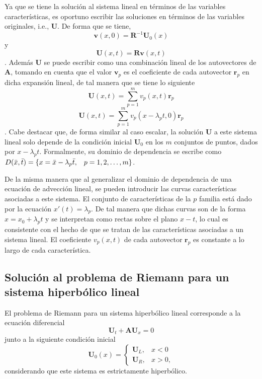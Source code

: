 Ya que se tiene la solución al sistema lineal en términos de las variables características, es oportuno escribir las soluciones en términos de las variables originales, i.e., $\mathbf{U}$. De forma que se tiene,
\begin{equation}
	\mathbf{v}(x,0) = \mathbf{R}^{-1} \mathbf{U}_0(x)
\end{equation}
y
\begin{equation}
	\mathbf{U}(x,t) = \mathbf{R} \mathbf{v}(x,t)
\end{equation}. Además $\mathbf{U}$ se puede escribir como una combinación lineal de los autovectores de $\mathbf{A}$, tomando en cuenta que el valor $\mathbf{v}_p$ es el coeficiente de cada autovector $\mathbf{r}_p$ en dicha expansión lineal, de tal manera que se tiene lo siguiente
\begin{equation}
	\mathbf{U}(x,t) = \sum_{p=1}^{m} v_p(x,t) \mathbf{r}_p
	\label{eq:sol-linear-sys}
\end{equation}
\begin{equation}
	\mathbf{U}(x,t) = \sum_{p=1}^{m} v_p(x - \lambda_p t, 0) \mathbf{r}_p
	\label{eq:sol-linear-sys-con-caracteristicas}
\end{equation}. Cabe destacar que, de forma similar al caso escalar, la solución $\mathbf{U}$ a este sistema lineal solo depende de la condición inicial $\mathbf{U}_0$ en los $m$ conjuntos de puntos, dados por $x - \lambda_p t$. Formalmente, su dominio de dependencia se escribe como $D(\bar{x}, \bar{t}) = \{x = \bar{x} - \lambda_{p} \bar{t}, \hspace{3mm} p = 1,2, \dots, m \}$.

De la misma manera que al generalizar el dominio de dependencia de una ecuación de advección lineal, se pueden introducir las curvas características asociadas a este sistema. El conjunto de características de la $p$ familia está dado por la ecuación $x'(t)=\lambda_{p}$. De tal manera que dichas curvas son de la forma $x = x_0 + \lambda_{p}t$ y se interpretan como rectas sobre el plano $x-t$, lo cual es consistente con el hecho de que se tratan de las características asociadas a un sistema lineal. El coeficiente $v_p(x,t)$ de cada autovector $\mathbf{r}_p$ es constante a lo largo de cada característica.

\subsection{Solución al problema de Riemann para un sistema hiperbólico lineal}
\label{sec:sol-riemann-lineal}
El problema de Riemann para un sistema hiperbólico lineal corresponde a la ecuación diferencial
\begin{equation}
	\mathbf{U}_t + \mathbf{A}\mathbf{U}_x = 0
\end{equation}
junto a la siguiente condición inicial
\begin{equation}
	\mathbf{U}_{0}(x) = 
	\begin{cases}
		\mathbf{U}_L, & x < 0 \\
		\mathbf{U}_R, & x > 0,
	\end{cases}
\end{equation}
considerando que este sistema es estrictamente hiperbólico.

